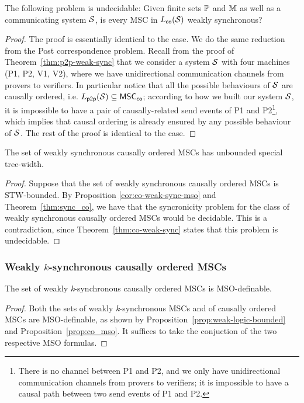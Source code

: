 \documentclass{article}
\begin{document}
\begin{theorem}\label{thm:co-weak-sync}
The following problem is undecidable:
Given finite sets $\mathbb{P}$ and $\mathbb{M}$ as well as a communicating system $\mathcal{S}$,
is every MSC in $L_{\mathsf{co}}(\mathcal{S})$ weakly synchronous?
\end{theorem}
\begin{proof}
The proof is essentially identical to the \pp case. We do the same reduction from the Post correspondence problem. Recall from the proof of Theorem~\ref{thm:p2p-weak-sync} that we consider a system $\mathcal{S}$ with four machines (P1, P2, V1, V2), where we have unidirectional communication channels from provers to verifiers. In particular notice that all the possible behaviours of $\mathcal{S}$ are causally ordered, i.e. $L_{\mathsf{p2p}}(\mathcal{S}) \subseteq \mathsf{MSC}_{\mathsf{co}}$; according to how we built our system $\mathcal{S}$, it is impossible to have a pair of causally-related send events of P1 and P2\footnote{There is no channel between P1 and P2, and we only have unidirectional communication channels from provers to verifiers; it is impossible to have a causal path between two send events of P1 and P2.}, which implies that causal ordering is already ensured by any possible \pp behaviour of $\mathcal{S}$. The rest of the proof is identical to the \pp case.
\end{proof}

\begin{corollary}
The set of weakly synchronous causally ordered MSCs has unbounded special tree-width.
\end{corollary}
\begin{proof}
Suppose that the set of weakly synchronous causally ordered MSCs is STW-bounded. By Proposition \ref{cor:co-weak-sync-mso} and Theorem~\ref{thm:sync_co}, we have that the syncronicity problem for the class of weakly synchronous causally ordered MSCs would be decidable. This is a contradiction, since Theorem~\ref{thm:co-weak-sync} states that this problem is undecidable.
\end{proof}

\subsubsection{Weakly \texorpdfstring{$k$}{k}-synchronous causally ordered MSCs} 

\begin{proposition}\label{prop:co-weak-k-sync-mso}
The set of weakly \emph{k}-synchronous causally ordered MSCs is MSO-definable.
\end{proposition}
\begin{proof}
Both the sets of weakly \emph{k}-synchronous MSCs and of causally ordered MSCs are MSO-definable, as shown by Proposition~\ref{prop:weak-logic-bounded} and Proposition~\ref{prop:co_mso}. It suffices to take the conjuction of the two respective MSO formulas.
\end{proof}
\end{document}
